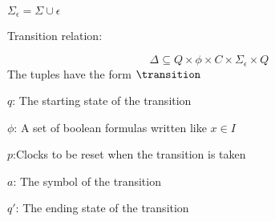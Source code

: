 $\Sigma_\epsilon=\Sigma\cup{\epsilon}$
\begin{definition}
    Transition relation:

    $$\Delta\subseteq Q\times\phi\times C\times\Sigma_\epsilon\times Q$$
The tuples have the form $\transition$

$q$: The starting state of the transition

$\phi$: A set of boolean formulas written like $x\in I$

$p$:Clocks to be reset when the transition is taken

$a$: The symbol of the transition

$q'$: The ending state of the transition
\end{definition}\cite*{Eugene2001}